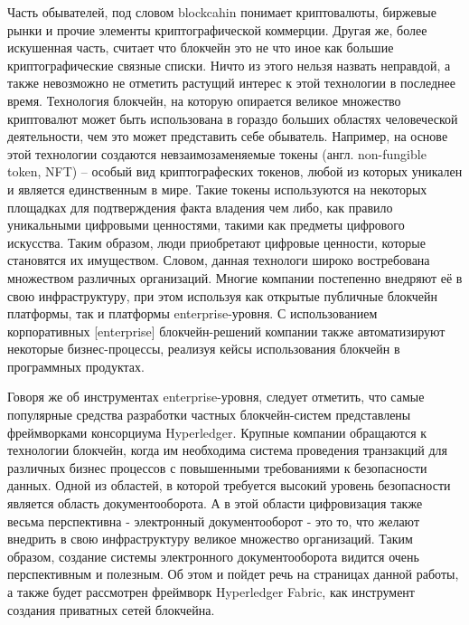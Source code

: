
{\actuality} 
Часть обывателей, под словом blockcahin понимает криптовалюты, биржевые рынки и прочие элементы криптографической коммерции.
Другая же, более искушенная часть, считает что блокчейн это не что иное как большие криптографические связные списки. Ничто из этого нельзя назвать неправдой, а также невозможно не отметить растущий интерес к этой технологии в последнее время. Технология блокчейн, на которую опирается великое множество криптовалют может быть использована в гораздо больших областях человеческой деятельности, чем это может представить себе обыватель.
Например, на основе этой технологии создаются невзаимозаменяемые токены (англ. non-fungible token, NFT) – особый вид криптографеских токенов, любой из которых уникален и является единственным в мире. Такие токены используются на некоторых площадках для подтверждения факта владения чем либо, как правило уникальными цифровыми ценностями, такими как предметы цифрового искусства. Таким образом, люди приобретают цифровые ценности, которые становятся их имуществом. Словом, данная технологи широко востребована множеством различных организаций. Многие компании постепенно внедряют её в свою инфраструктуру, при этом используя как открытые публичные блокчейн платформы, так и платформы enterprise-уровня. С использованием корпоративных [enterprise] блокчейн-решений компании также автоматизируют некоторые бизнес-процессы, реализуя кейсы использования блокчейн в программных продуктах.

Говоря же об инструментах enterprise-уровня, следует отметить, что самые популярные средства разработки частных блокчейн-систем представлены фреймворками консорциума Hyperledger. Крупные компании обращаются к технологии блокчейн, когда им необходима система проведения транзакций для различных бизнес процессов с повышенными требованиями к безопасности данных. Одной из областей, в которой требуется высокий уровень безопасности является область документооборота. А в этой области цифровизация также весьма перспективна - электронный документооборот - это то, что желают внедрить в свою инфраструктуру великое множество организаций. Таким образом, создание системы электронного документооборота видится очень перспективным и полезным. Об этом и пойдет речь на страницах данной работы, а также будет рассмотрен фреймворк Hyperledger Fabric, как инструмент создания приватных сетей блокчейна.

